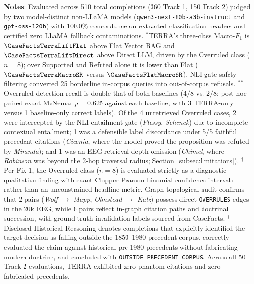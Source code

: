 \begin{landscape}
\raggedright \footnotesize \textbf{Notes:} Evaluated across 510 total completions (360 Track 1, 150 Track 2) judged by two model-distinct non-LLaMA models (\texttt{qwen3-next-80b-a3b-instruct} and \texttt{gpt-oss-120b}) with 100.0\% concordance on extracted classification headers and certified zero LLaMA fallback contaminations.
$^*$TERRA's three-class Macro-$F_1$ is $\CaseFactsTerraLiftFlat$ above Flat Vector RAG and $\CaseFactsTerraLiftDirect$ above Direct LLM, driven by the Overruled class ($n=8$); over Supported and Refuted alone it is lower than Flat ($\CaseFactsTerraMacroSR$ versus $\CaseFactsFlatMacroSR$). NLI gate safety filtering converted 25 borderline in-corpus queries into out-of-corpus refusals.
$^{**}$Overruled detection recall is double that of both baselines ($4/8$ vs. $2/8$; post-hoc paired exact McNemar $p=0.625$ against each baseline, with 3 TERRA-only versus 1 baseline-only correct labels). Of the 4 unretrieved Overruled cases, 2 were intercepted by the NLI entailment gate (\textit{Plessy}, \textit{Schenck}) due to incomplete contextual entailment; 1 was a defensible label discordance under 5/5 faithful precedent citations (\textit{Cicenia}, where the model proved the proposition was refuted by \textit{Miranda}); and 1 was an EEG retrieval depth omission (\textit{Chimel}, where \textit{Robinson} was beyond the 2-hop traversal radius; Section~\ref{subsec:limitations}).
$^\dagger$Per Fix 1, the Overruled class ($n=8$) is evaluated strictly as a diagnostic qualitative finding with exact Clopper-Pearson binomial confidence intervals rather than an unconstrained headline metric. Graph topological audit confirms that 2 pairs (\textit{Wolf $\to$ Mapp}, \textit{Olmstead $\to$ Katz}) possess direct \texttt{OVERRULES} edges in the 20k EEG, while 6 pairs reflect in-graph citation paths and doctrinal succession, with ground-truth invalidation labels sourced from CaseFacts.
$^\ddagger$Disclosed Historical Reasoning denotes completions that explicitly identified the target decision as falling outside the 1850--1980 precedent corpus, correctly evaluated the claim against historical pre-1980 precedents without fabricating modern doctrine, and concluded with \texttt{OUTSIDE PRECEDENT CORPUS}. Across all 50 Track 2 evaluations, TERRA exhibited zero phantom citations and zero fabricated precedents.
\endgroup
\end{landscape}
\clearpage

